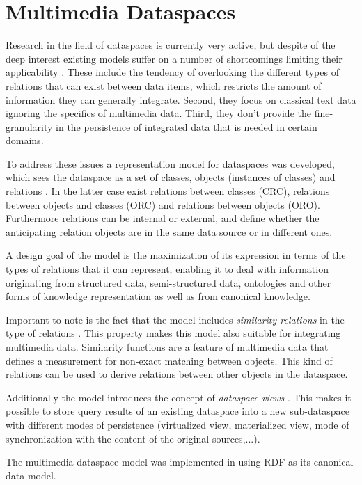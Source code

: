 \section{Multimedia Dataspaces}


Research in the field of dataspaces is currently very active, but despite of the deep interest existing models suffer on a number of shortcomings limiting their applicability \cite[p. 1]{6167826}.
These include the tendency of overlooking the different types of relations that can exist between data items, which restricts the amount of information they can generally integrate.
Second, they focus on classical text data ignoring the specifics of multimedia data. 
Third, they don't provide the fine-granularity in the persistence of integrated data that is needed in certain domains.

To address these issues a representation model for dataspaces was developed, which sees the dataspace as a set of classes, objects (instances of classes) and relations \cite[p. 1]{6167826}.
In the latter case exist relations between classes (CRC), relations between objects and classes (ORC) and relations between objects (ORO).
Furthermore relations can be internal or external, and define whether the anticipating relation objects are in the same data source or in different ones.

A design goal of the model is the maximization of its expression in terms of the types of relations that it can represent, enabling it to deal with information originating from structured data, semi-structured data, ontologies and other forms of knowledge representation as well as from canonical  
knowledge.

Important to note is the fact that the model includes \emph{similarity relations} in the type of relations \cite[p. 3-4]{6167826}. This property makes this model also suitable for integrating multimedia data.
Similarity functions are a feature of multimedia data that defines a measurement for non-exact matching between objects.
This kind of relations can be used to derive relations between other objects in the dataspace.

Additionally the model introduces the concept of \emph{dataspace views} \cite[p. 3]{6167826}. 
This makes it possible to store query results of an existing dataspace into a new sub-dataspace with different modes of persistence (virtualized view, materialized view, mode of synchronization with the content of the original sources,...).

The multimedia dataspace model was implemented in \cite[p. 30]{ZerrikBachelorThesis} using RDF as its canonical data model.



